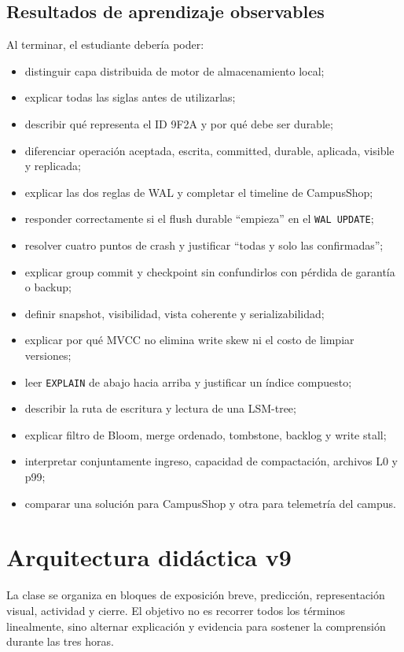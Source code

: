 \documentclass[variant=docente,cover=institutional,mode=screen]{ua-engineering-v6-article}
\begin{document}
\subsection{Resultados de aprendizaje observables}

Al terminar, el estudiante debería poder:

\begin{itemize}
\item distinguir capa distribuida de motor de almacenamiento local;
\item explicar todas las siglas antes de utilizarlas;
\item describir qué representa el ID 9F2A y por qué debe ser durable;
\item diferenciar operación aceptada, escrita, committed, durable, aplicada, visible y replicada;
\item explicar las dos reglas de WAL y completar el timeline de CampusShop;
\item responder correctamente si el flush durable ``empieza'' en el \texttt{WAL UPDATE};
\item resolver cuatro puntos de crash y justificar ``todas y solo las confirmadas'';
\item explicar group commit y checkpoint sin confundirlos con pérdida de garantía o backup;
\item definir snapshot, visibilidad, vista coherente y serializabilidad;
\item explicar por qué MVCC no elimina write skew ni el costo de limpiar versiones;
\item leer \texttt{EXPLAIN} de abajo hacia arriba y justificar un índice compuesto;
\item describir la ruta de escritura y lectura de una LSM-tree;
\item explicar filtro de Bloom, merge ordenado, tombstone, backlog y write stall;
\item interpretar conjuntamente ingreso, capacidad de compactación, archivos L0 y p99;
\item comparar una solución para CampusShop y otra para telemetría del campus.
\end{itemize}

\section{Arquitectura didáctica v9}

La clase se organiza en bloques de exposición breve, predicción, representación visual, actividad y cierre. El objetivo no es recorrer todos los términos linealmente, sino alternar explicación y evidencia para sostener la comprensión durante las tres horas.
\end{document}
